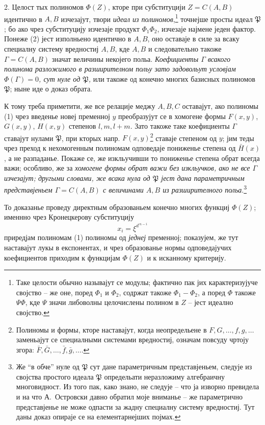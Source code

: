 ﻿\documentclass[11pt]{article}
\begin{document}
2. Целост тых полиномов $\Phi(Z)$, кторе при субституцији $Z=C(A,B)$ идентично в $A,B$ изчезајут, твори \emph{идеал из полиномов},\footnote{Таке целости обычно называјут се модулы; фактично пак јих карактеризујуче својство -- же оне, поред $\Phi_1$ и $\Phi_2$, содржат такоже $\Phi_1-\Phi_2$, а поред $\Phi$ такоже $\Psi\Phi$, кде $\Psi$ значи либоволны целочислены полином в $Z$ -- јест идеално својство.} точнејше просты идеал $\mathfrak P$; бо ако чрез субституцију изчезаје продукт $\Phi_1\Phi_2$, изчезаје најмене једен фактор. Понеже (2) јест изполньено идентично в $A,B$, оно оставаје в силе за всаку специалну систему вредностиј $A,B$, кде $A,B$ и следовательно такоже $\Gamma=C(A,B)$ значат величины некојего польа. \emph{Коефициенты $\Gamma$ всакого полинома разложимого в разширителном польу зато задовольут условјам $\Phi(\Gamma)=0$, сут нуле од $\mathfrak P$,} или такоже од конечно многих базисных полиномов $\mathfrak P$; ныне иде о доказ обрата.

К тому треба приметити, же все релације меджу $A,B,C$ оставајут, ако полиномы (1) чрез введенье новеј пременној $y$ преобразујут се в хомогене формы $F(x,y)$, $G(x,y)$, $H(x,y)$ степенов $l,m,l+m$. Зато такоже таке коефициенты $\Gamma$ ставајут нулами $\mathfrak P$, при кторых напр. $F(x,y)$\footnote{Полиномы и формы, кторе наставајут, когда неопредельене в $F,G,\ldots,f,g,\ldots$ заменьајут се специалными системами вредностиј, означам повсуду чртоју згора: $\bar F,\bar G,\ldots,\bar f,\bar g,\ldots$.} ставаје степеном од $y$; јим теды чрез преход к нехомогенным полиномам одповедаје пониженье степена од $\bar H(x)$, а не разпаданье. Покаже се, же изкльучивши то пониженье степена обрат всегда важи; особливо, же за \emph{хомогене формы обрат важи без изкльучков, ако не все $\Gamma$ изчезајут; другыми словами, же всака нула од $\mathfrak P$ јест дана параметричным представјеньем $\Gamma=C(A,B)$ с величинами $A,B$ из разширителного польа}.\footnote{Же ``в обче'' нуле од $\mathfrak P$ сут дане параметричным представјеньем, следује из својства простого идеала $\mathfrak P$ определьати неразложиму алгебраичну многовидност. Из того пак, како знано, не следује -- что ја изворно превидела и на что \mbox{А.~Островски} давно обратил моје вниманье -- же параметрично представјенье не може одпасти за жадну специалну систему вредностиј. Тут даны доказ опираје се на елементарнејших појмах.}

То доказанье проведу директным образованьем конечно многих функциј $\Phi(Z)$; именнно чрез Кронецкерову субституцију
\[
 x_i=\xi^{d^{\,n-i}}
\]
приредјам полиномам (1) полиномы од \emph{једнеј} пременној; показујем, же тут наставајут лукы в експонентах, и чрез образованье нормы одповедајучих коефициентов приходим к функцијам $\Phi(Z)$ и к исканному критерију.
\end{document}
